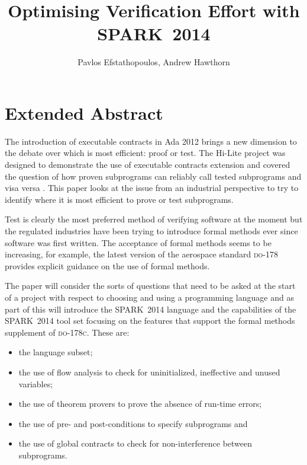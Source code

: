 \documentclass{llncs}
\newcommand{\DO}{\textsc{do-178}\xspace}
\newcommand{\DOC}{\textsc{do-178c}\xspace}
\newcommand{\newspark}{SPARK~2014\xspace}
\begin{document}
\title{Optimising Verification Effort with \newspark}

\author{Pavlos Efstathopoulos, Andrew Hawthorn}

\maketitle

\section{Extended Abstract}
The introduction of executable contracts in Ada 2012 brings a new
dimension to the debate over which is most efficient: proof or
test. The Hi-Lite project was designed to demonstrate the use of executable 
contracts extension
and covered the question of how proven subprograms can reliably call
tested subprograms and visa versa \cite{hiliteERTS2012}. This paper
looks at the issue from an industrial perspective to try to identify
where it is most efficient to prove or test subprograms.

Test is clearly the most preferred method of verifying software at the
moment but the regulated industries have been trying to introduce formal
methods ever since software was first written. The
acceptance of formal methods seems to be increasing, for example, the
latest version of the aerospace standard \DO provides explicit
guidance on the use of formal methods.

The paper will consider the sorts of questions that need to be
asked at the start of a project with respect to choosing and using a
programming language and as part of this will introduce the \newspark 
language and the
capabilities of the \newspark tool set focusing on the features that
support the formal methods supplement of \DOC. These are:
\begin{itemize}
   \item the language subset;
   \item the use of flow analysis to check for uninitialized, ineffective
         and unused variables;
   \item the use of theorem provers to prove the absence of run-time errors;
   \item the use of pre- and post-conditions to specify subprograms and
   \item the use of global contracts to check for non-interference between 
         subprograms.
\end{itemize}
\end{document}

